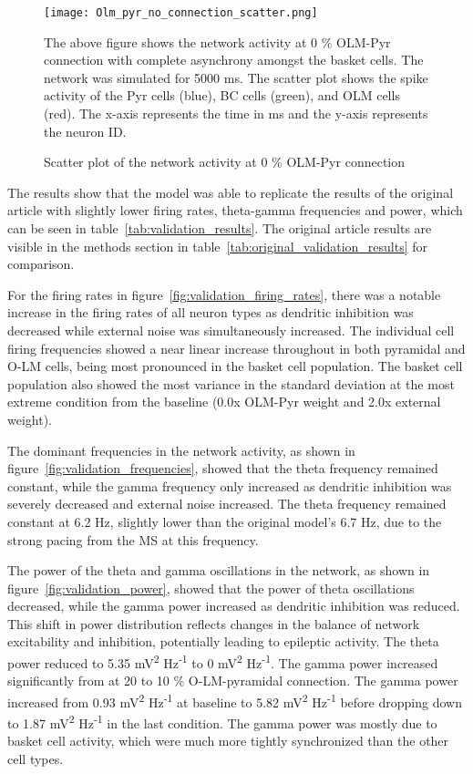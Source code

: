 \begin{figure}[htbp]
    \centering
    \texttt{[image: Olm\_pyr\_no\_connection\_scatter.png]}
    \caption[0 \% OLM-Pyr connection scatter plot]{Scatter plot of the network activity at 0 \% OLM-Pyr connection}\label{fig:scatterplot_0_con_olm_pyr}
    \begin{minipage}{0.9\textwidth}
        The above figure shows the network activity at 0 \% OLM-Pyr connection with complete asynchrony amongst the basket cells.
        The network was simulated for 5000 ms.
        The scatter plot shows the spike activity of the Pyr cells (blue), BC cells (green), and OLM cells (red).
        The x-axis represents the time in ms and the y-axis represents the neuron ID\@.
    \end{minipage}
\end{figure}

The results show that the model was able to
replicate the results of the original article with slightly lower firing rates,
theta-gamma frequencies and power, which can be seen in
table~\ref{tab:validation_results}. The original article results are visible in
the methods section in table~\ref{tab:original_validation_results} for comparison.

For the firing rates in figure~\ref{fig:validation_firing_rates},
there was a notable increase in the firing rates of all neuron types as dendritic inhibition was
decreased while external noise was simultaneously increased.
The individual cell firing frequencies showed a near linear increase throughout in both pyramidal and O-LM cells,
being most pronounced in the basket cell population.
The basket cell population also showed the most variance in the standard deviation at the most extreme
condition from the baseline (0.0x OLM-Pyr weight and 2.0x external weight).

The dominant frequencies in the network activity, as shown in figure~\ref{fig:validation_frequencies},
showed that the theta frequency remained constant, while the gamma frequency only increased as dendritic inhibition was severely decreased and external noise increased.
The theta frequency remained constant at 6.2 Hz, slightly lower than the original model's 6.7 Hz, due to the strong pacing from the MS at this frequency.

The power of the theta and gamma oscillations in the network, as shown in figure~\ref{fig:validation_power},
showed that the power of theta oscillations decreased, while the gamma power increased as dendritic inhibition was reduced.
This shift in power distribution reflects changes in the balance of network excitability and inhibition, potentially leading to epileptic activity.
The theta power reduced to 5.35 mV\textsuperscript{2} Hz\textsuperscript{-1} to 0 mV\textsuperscript{2} Hz\textsuperscript{-1}.
The gamma power increased significantly from at 20 to 10 \% O-LM-pyramidal connection. The gamma power increased from 0.93 mV\textsuperscript{2} Hz\textsuperscript{-1}
at baseline to 5.82 mV\textsuperscript{2} Hz\textsuperscript{-1} before dropping down to 1.87 mV\textsuperscript{2} Hz\textsuperscript{-1} in the last condition.
The gamma power was mostly due to basket cell activity, which were much more tightly synchronized than the other cell types.

